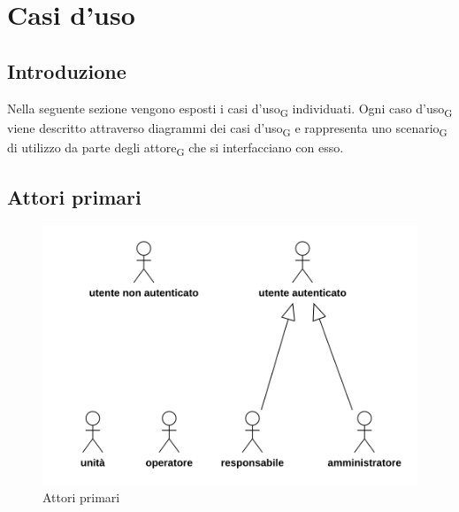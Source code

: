 \section{Casi d'uso}
\subsection{Introduzione}
Nella seguente sezione vengono esposti i casi d'uso\textsubscript{G} individuati. Ogni caso d'uso\textsubscript{G} viene descritto attraverso diagrammi dei casi d'uso\textsubscript{G} e rappresenta uno scenario\textsubscript{G} di utilizzo da parte degli attore\textsubscript{G} che si interfacciano con esso.
\subsection{Attori primari}
\begin{figure}[H]
	\centering
	\includegraphics[scale=0.75]{res/images/gerarchia.png}
	\caption{Attori primari}
\end{figure}
